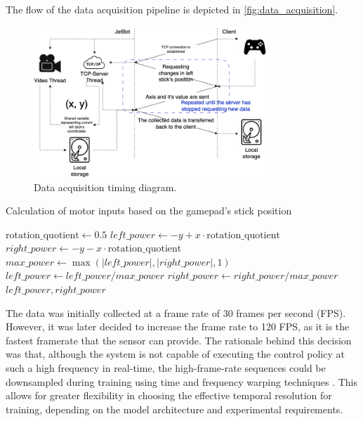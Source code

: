The flow of the data acquisition pipeline is depicted in \autoref{fig:data_acquisition}.

\begin{figure}[htbp]
  \centering
  \includegraphics[width=0.8\textwidth]{Images/data_acquisition.png}
  \caption{Data acquisition timing diagram.}
  \label{fig:data_acquisition}
\end{figure}

\begin{algorithm}
  \caption{Calculation of motor inputs based on the gamepad's stick position}
  \begin{algorithmic}[1]
    \State $\text{rotation\_quotient} \gets 0.5$
    \State $left\_power \gets -y + x \cdot \text{rotation\_quotient}$
    \State $right\_power \gets -y - x \cdot \text{rotation\_quotient}$
    \State $max\_power \gets \max\left( \left|left\_power\right|, \left|right\_power\right|, 1 \right)$
    \State $left\_power \gets left\_power / max\_power$
    \State $right\_power \gets right\_power / max\_power$
    \State \Return $left\_power, right\_power$
    \EndFunction
  \end{algorithmic}
  \label{alg:motor_inputs}
\end{algorithm}

The data was initially collected at a frame rate of 30 frames per second (FPS). However, it was later decided to increase the frame rate to 120 FPS, as it is the fastest framerate that the sensor can provide. The rationale behind this decision was that, although the system is not capable of executing the control policy at such a high frequency in real-time, the high-frame-rate sequences could be downsampled during training using time and frequency warping techniques \autocite{iglesias2023data}. This allows for greater flexibility in choosing the effective temporal resolution for training, depending on the model architecture and experimental requirements.

